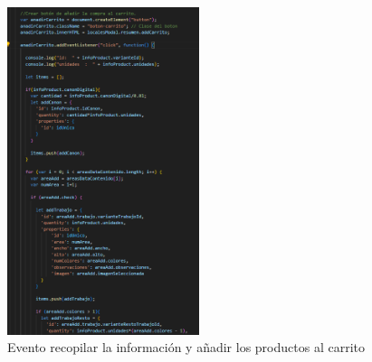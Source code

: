 \documentclass[11pt]{article}
\begin{document}
\begin{figure}[H]
    \centering
    \includegraphics[width=0.5\textwidth]{imagenesUS3-modal/AnadirCarritoParte1addEventListenerCracionBoton.png}
    \caption{\label{fig:addCarritoEvento} Evento recopilar la información y añadir los productos al carrito}
    \vspace{\fill}
\end{figure}
\end{document}
